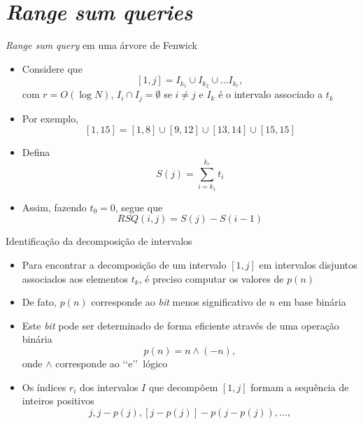 \section{\it Range sum queries}

\begin{frame}[fragile]{\textit{Range sum query} em uma árvore de Fenwick}

    \begin{itemize}
        \item Considere que 
        \[
            [1, j] = I_{k_1} \cup I_{k_2} \cup \ldots I_{k_r},
        \]
        com $r = O(\log N)$, $I_i \cap I_j = \emptyset$ se $i\neq j$ e $I_k$ é o intervalo associado
        a $t_k$

        \item Por exemplo,
        \[
            [1, 15] = [1, 8]\cup [9, 12]\cup [13, 14]\cup [15, 15]
        \]

        \item Defina
        \[
            S(j) = \sum_{i = k_1}^{k_r} t_i
        \]

        \item Assim, fazendo $t_0 = 0$, segue que
        \[
            RSQ(i, j) = S(j) - S(i - 1)
        \]

    \end{itemize}

\end{frame}

\begin{frame}[fragile]{Identificação da decomposição de intervalos}

    \begin{itemize}
        \item Para encontrar a decomposição de um intervalo $[1, j]$ em intervalos disjuntos 
            associados aos elementos $t_k$, é preciso computar os valores de $p(n)$

        \item De fato, $p(n)$ corresponde ao \textit{bit} menos significativo de $n$ em base
            binária

        \item Este \textit{bit} pode ser determinado de forma eficiente através de uma operação
            binária
        \[
            p(n) = n \land (-n),
        \]
        onde $\land$ corresponde ao \lq\lq e\rq\rq\ lógico

        \item Os índices $r_i$ dos intervalos $I$ que decompõem $[1,j]$ formam a sequência
            de inteiros positivos 
        \[
            j, j - p(j), [j - p(j)] - p(j - p(j)), \ldots,
        \]
    \end{itemize}

\end{frame}

